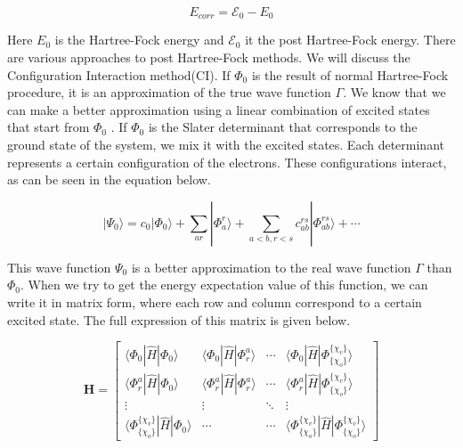 \begin{equation}\label{eq:Ecorr}
  E_{corr} = \mathcal{E}_0 - E_0
\end{equation}

Here $E_0$ is the Hartree-Fock energy and $\mathcal{E}_0$ it the post Hartree-Fock energy. There are various approaches to post Hartree-Fock methods. We will discuss the
Configuration Interaction method(CI).
If $\Phi_0$ is the result of normal Hartree-Fock procedure, it is an approximation of the true wave function $\Gamma$. We know that we can make a better approximation
using a linear combination of excited states that start from $\Phi_0$ \cite{Szabo1996}. If $\Phi_0$ is the Slater determinant that corresponds to the ground state of the system, we
mix it with the excited states. Each determinant represents a certain configuration of the electrons. These configurations interact, as can be seen in the equation below.

\begin{equation}\label{eq:lincomb}
  |\Psi_0\rangle = c_0|\Phi_0\rangle + \sum_{ar}|\Phi_a^r\rangle + \sum_{a<b,r<s}c_{ab}^{rs}|\Phi^{rs}_{ab} \rangle + \cdots
\end{equation}

This wave function $\Psi_0$ is a better approximation to the real wave function $\Gamma$ than $\Phi_0$. When we try to get the energy expectation value of this function, we can write
it in matrix form, where each row and column correspond to a certain excited state. The full expression of this matrix is given below.

\begin{equation}\label{eq:hamexp1}
  \mathbf{H} = \begin{bmatrix}
    \langle \Phi_0 | \hat{H} | \Phi_0 \rangle                         & \langle \Phi_0 | \hat{H} | \Phi_r^a \rangle   & \cdots & \langle \Phi_0 | \hat{H} | \Phi_{\{\chi_o\}}^{\{\chi_v\}} \rangle \\
    \langle \Phi_r^a | \hat{H} | \Phi_0 \rangle                       & \langle \Phi_r^a | \hat{H} | \Phi_r^a \rangle & \cdots & \langle \Phi_r^a | \hat{H} | \Phi_{\{\chi_o\}}^{\{\chi_v\}} \rangle \\
    \vdots                                                            & \vdots                                        & \ddots & \vdots                                                                                    \\
    \langle \Phi_{\{\chi_o\}}^{\{\chi_v\}} | \hat{H} | \Phi_0 \rangle & \cdots                                         & \cdots & \langle \Phi_{\{\chi_o\}}^{\{\chi_v\}} | \hat{H} | \Phi_{\{\chi_o\}}^{\{\chi_v\}} \rangle
  \end{bmatrix}
\end{equation}

